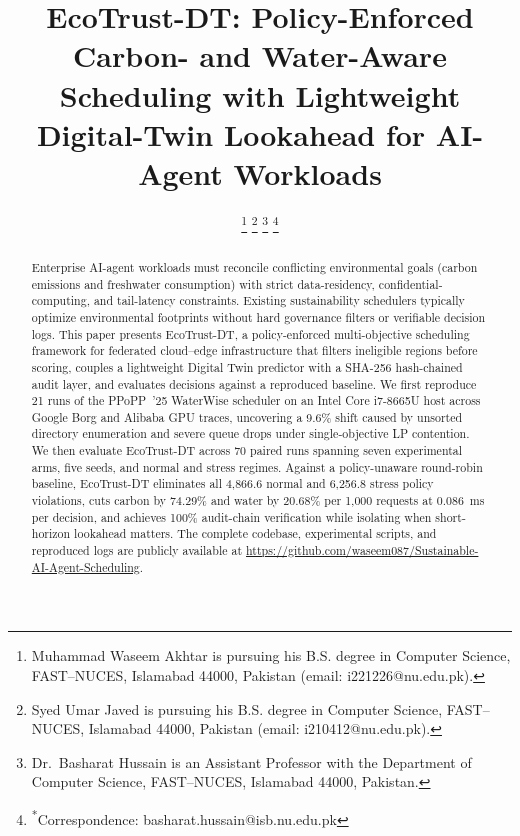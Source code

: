 \documentclass[conference]{IEEEtran}
\begin{document}
\title{EcoTrust-DT: Policy-Enforced Carbon- and Water-Aware Scheduling with Lightweight Digital-Twin Lookahead for AI-Agent Workloads}

\author{
\thanks{Muhammad Waseem Akhtar is pursuing his B.S. degree in Computer Science, FAST--NUCES, Islamabad 44000, Pakistan (email: i221226@nu.edu.pk).}
\thanks{Syed Umar Javed is pursuing his B.S. degree in Computer Science, FAST--NUCES, Islamabad 44000, Pakistan (email: i210412@nu.edu.pk).}
\thanks{Dr.\ Basharat Hussain is an Assistant Professor with the Department of Computer Science, FAST--NUCES, Islamabad 44000, Pakistan.}
\thanks{\textsuperscript{*}Correspondence: basharat.hussain@isb.nu.edu.pk}
}

\maketitle

\begin{abstract}
Enterprise AI-agent workloads must reconcile conflicting environmental goals (carbon emissions and freshwater consumption) with strict data-residency, confidential-computing, and tail-latency constraints. Existing sustainability schedulers typically optimize environmental footprints without hard governance filters or verifiable decision logs. This paper presents EcoTrust-DT, a policy-enforced multi-objective scheduling framework for federated cloud--edge infrastructure that filters ineligible regions before scoring, couples a lightweight Digital Twin predictor with a SHA-256 hash-chained audit layer, and evaluates decisions against a reproduced baseline. We first reproduce 21 runs of the PPoPP~'25 WaterWise scheduler on an Intel Core i7-8665U host across Google Borg and Alibaba GPU traces, uncovering a 9.6\% shift caused by unsorted directory enumeration and severe queue drops under single-objective LP contention. We then evaluate EcoTrust-DT across 70 paired runs spanning seven experimental arms, five seeds, and normal and stress regimes. Against a policy-unaware round-robin baseline, EcoTrust-DT eliminates all 4,866.6 normal and 6,256.8 stress policy violations, cuts carbon by 74.29\% and water by 20.68\% per 1,000 requests at 0.086~ms per decision, and achieves 100\% audit-chain verification while isolating when short-horizon lookahead matters. The complete codebase, experimental scripts, and reproduced logs are publicly available at \url{https://github.com/waseem087/Sustainable-AI-Agent-Scheduling}.
\end{abstract}
\end{document}
